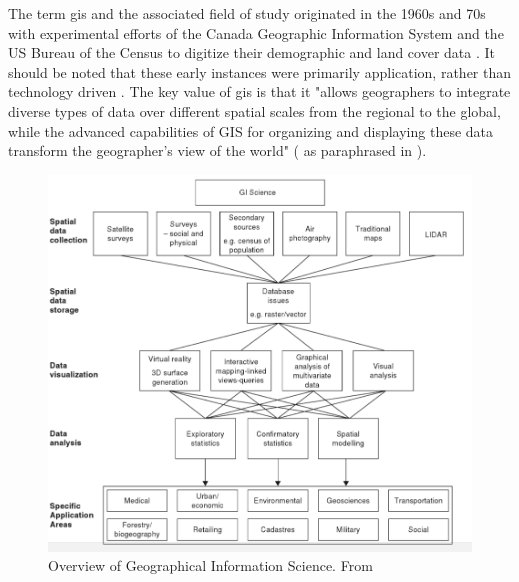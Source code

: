 The term \ac{gis} and the associated field of study originated in the 1960s and 70s with experimental efforts of the Canada Geographic Information System and the US Bureau of the Census to digitize their demographic and land cover data \cite{goodchildGeographicInformationSystems1994}. It should be noted that these early instances were primarily application, rather than technology driven \cite{goodchildGeographicalInformationScience1992}. The key value of \ac{gis} is that it "allows geographers to integrate diverse types of data over different spatial scales from the regional to the global, while the advanced capabilities of GIS for organizing and displaying these data transform the geographer's view of the world" (\cite{tomlinsonPRESIDENTIALADDRESSGEOGRAPHIC1989} as paraphrased in \cite{vereginComputerInnovationAdoption1994}).

\begin{figure}[h]
	\centering
	\includegraphics[scale=0.4]{Figures/chap2/GIScience.png}
	\caption[Overview of Geographical Information Science]{Overview of Geographical Information Science. From \cite{fotheringhamGeographicInformationScience2007}}
	\label{fig:giscience}
\end{figure}


